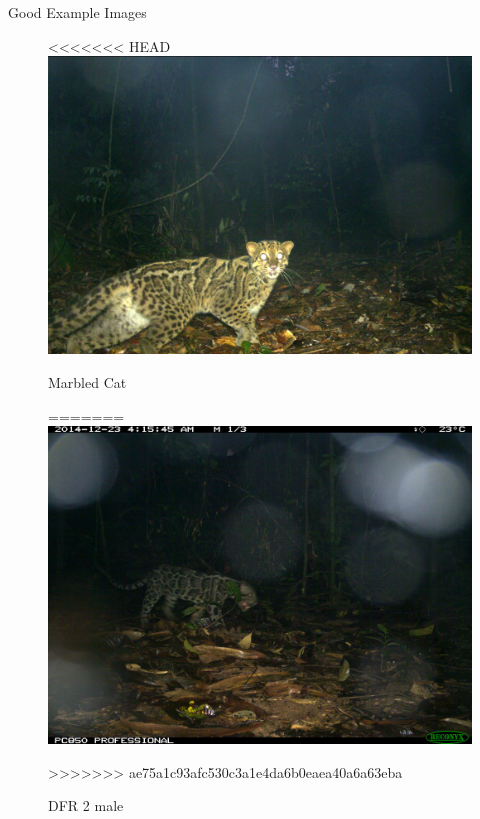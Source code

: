 \documentclass[10pt]{beamer}
\begin{document}

\begin{frame}{Good Example Images}		
	\centering
	\begin{minipage}[c]{0.48\linewidth}
		\begin{figure}
<<<<<<< HEAD
			\includegraphics[width=\linewidth,height=\textheight,keepaspectratio]{images/example_marbled_cat.JPG}
			\caption{Marbled Cat}
=======
			\includegraphics[width=\linewidth,height=\textheight,keepaspectratio]{images/example_DFR_2_male.JPG}
			\caption{DFR 2 male}
>>>>>>> ae75a1c93afc530c3a1e4da6b0eaea40a6a63eba
		\end{figure}
	\end{minipage}
	\hfill
	\begin{minipage}[c]{0.48\linewidth}

\end{minipage}
\end{frame}
\end{document}
